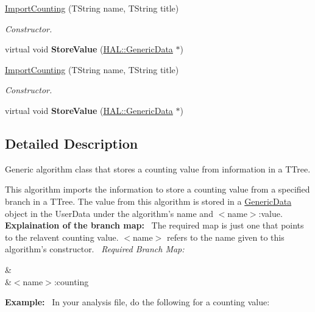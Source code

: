 \begin{DoxyCompactItemize}
\item 
\hyperlink{class_h_a_l_1_1_algorithms_1_1_import_counting_a533c67ebac3fbcb71c800ccb794bdf24}{Import\+Counting} (T\+String name, T\+String title)
\begin{DoxyCompactList}\small\item\em Constructor. \end{DoxyCompactList}\item 
\hypertarget{class_h_a_l_1_1_algorithms_1_1_import_counting_a5c11aa12b91c4fbe66a76d4acbfd0033}{virtual void {\bfseries Store\+Value} (\hyperlink{class_h_a_l_1_1_generic_data}{H\+A\+L\+::\+Generic\+Data} $\ast$)}\label{class_h_a_l_1_1_algorithms_1_1_import_counting_a5c11aa12b91c4fbe66a76d4acbfd0033}

\item 
\hyperlink{class_h_a_l_1_1_algorithms_1_1_import_counting_a533c67ebac3fbcb71c800ccb794bdf24}{Import\+Counting} (T\+String name, T\+String title)
\begin{DoxyCompactList}\small\item\em Constructor. \end{DoxyCompactList}\item 
\hypertarget{class_h_a_l_1_1_algorithms_1_1_import_counting_a5c11aa12b91c4fbe66a76d4acbfd0033}{virtual void {\bfseries Store\+Value} (\hyperlink{class_h_a_l_1_1_generic_data}{H\+A\+L\+::\+Generic\+Data} $\ast$)}\label{class_h_a_l_1_1_algorithms_1_1_import_counting_a5c11aa12b91c4fbe66a76d4acbfd0033}

\end{DoxyCompactItemize}


\subsection{Detailed Description}
Generic algorithm class that stores a counting value from information in a T\+Tree. 

This algorithm imports the information to store a counting value from a specified branch in a T\+Tree. The value from this algorithm is stored in a \hyperlink{class_h_a_l_1_1_generic_data}{Generic\+Data} object in the User\+Data under the algorithm's name and $<$name$>$\+:value.~\newline
~\newline
{\bfseries Explaination of the branch map\+:}~\newline
The required map is just one that points to the relavent counting value. $<$name$>$ refers to the name given to this algorithm's constructor.~\newline
{\itshape Required Branch Map\+:} \begin{TabularC}{2}
\hline
{}&\PBS{}\\
&\PBS\centering $<$name$>$\+:counting \\
\end{TabularC}
{\bfseries Example\+:}~\newline
In your analysis file, do the following for a counting value\+:


